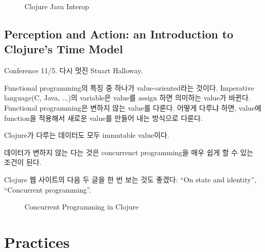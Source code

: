 \documentclass[11pt]{article}
\begin{document}
\begin{figure}[t]
    \begin{Frame}
        \begin{center}
        \end{center}
    \end{Frame}
    \caption{Clojure Java Interop}
    \label{clojure java}
\end{figure}

 
\subsection{Perception and Action: an Introduction to Clojure's Time Model}

Conference 11/5. 다시 멋진 Stuart Halloway.
 
 
Functional programming의 특징 중 하나가 value-oriented라는
것이다. Imperative language(C, Java, ...)의 variable은 value를 assign
하면 의미하는 value가 바뀐다. Functional programming은 변하지 않는
value를 다룬다. 어떻게 다루냐 하면, value에 function을 적용해서 새로운
value를 만들어 내는 방식으로 다룬다.
 
Clojure가 다루는 데이터도 모두  immutable value이다. 
 
데이터가 변하지 않는 다는 것은 concurrenct programming을 매우 쉽게 할
수 있는 조건이 된다.
 
Clojure 웹 사이트의 다음 두 글을 한 번 보는 것도 좋겠다:  ``On state and
identity'', ``Concurrent programming''.
 
\begin{figure}[t]
    \begin{Frame}
        \begin{center}
        \end{center}
    \end{Frame}
    \caption{Concurrent Programming in Clojure}
    \label{clojure concurrent}
\end{figure}

\section{Practices}
\end{document}

